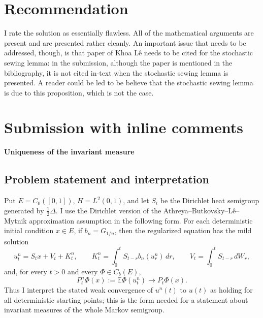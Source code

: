 \documentclass[12pt]{article}
\newcommand{\E}{\mathbb E}
\newcommand{\1}{\mathbf 1}
\begin{document}
\section{Recommendation}

  I rate the solution as essentially flawless. All of the mathematical arguments are present and are presented rather cleanly. An important issue that needs to be addressed, though, is that paper of Khoa Lê needs to be cited for the stochastic sewing lemma: in the submission, although the paper is mentioned in the bibliography, it is not cited in-text when the stochastic sewing lemma is presented. A reader could be led to be believe that the stochastic sewing lemma is due to this proposition, which is not the case.

  \section{Submission with inline comments}


\date{}

\begin{center}
{\bf Uniqueness of the invariant measure}
\end{center}

\subsection*{Problem statement and interpretation}

Put \(E=C_0([0,1])\), \(H=L^2(0,1)\), and let \(S_t\) be the Dirichlet heat
semigroup generated by \(\frac12\Delta\).  I use the Dirichlet version of the
Athreya--Butkovsky--L\^e--Mytnik approximation assumption in the following
form.  For each deterministic initial condition \(x\in E\), if \(b_n=G_{1/n}\),
then the regularized equation has the mild solution
\[
  u_t^n=S_t x+V_t+K_t^n,\qquad
  K_t^n=\int_0^tS_{t-r}b_n(u_r^n)\,dr,\qquad
  V_t=\int_0^tS_{t-r}\,dW_r ,
\]
and, for every \(t>0\) and every \(\Phi\in C_b(E)\),
\[
        P_t^n\Phi(x):=\E\Phi(u_t^n)\longrightarrow P_t\Phi(x).
        \tag{1}
\]
Thus I interpret the stated weak convergence of \(u^n(t)\) to \(u(t)\) as
holding for all deterministic starting points; this is the form needed for a
statement about invariant measures of the whole Markov semigroup.
\end{document}
